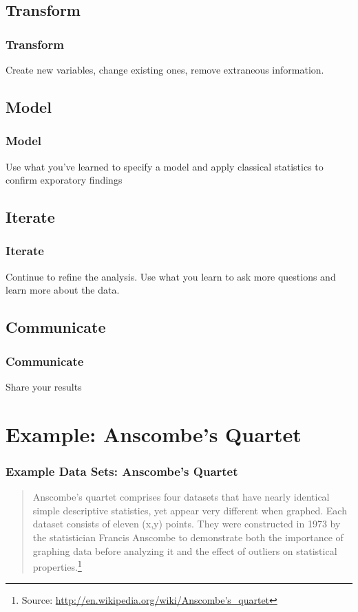\documentclass{beamer}
\begin{document}
\subsection{Transform}
\begin{frame}
\frametitle{Transform}

Create new variables, change existing ones, remove extraneous information.
\end{frame}



\subsection{Model}
\begin{frame}
\frametitle{Model}

Use what you've learned to specify a model and apply classical statistics to confirm exporatory findings

\end{frame}



\subsection{Iterate}
\begin{frame}
\frametitle{Iterate}
Continue to refine the analysis. Use what you learn to ask more questions and learn more about the data.
\end{frame}



\subsection{Communicate}
\begin{frame}
\frametitle{Communicate}
Share your results
\end{frame}



\section{Example: Anscombe's Quartet}
\begin{frame}[fragile]
\frametitle{Example Data Sets: Anscombe's Quartet}

\begin{quote}
Anscombe's quartet comprises four datasets that have nearly identical simple descriptive statistics, yet appear very different when graphed. Each dataset consists of eleven (x,y) points. They were constructed in 1973 by the statistician Francis Anscombe to demonstrate both the importance of graphing data before analyzing it and the effect of outliers on statistical properties.\footnote{Source: \url{http://en.wikipedia.org/wiki/Anscombe's_quartet}}
\end{quote}

\end{frame}
\end{document}
